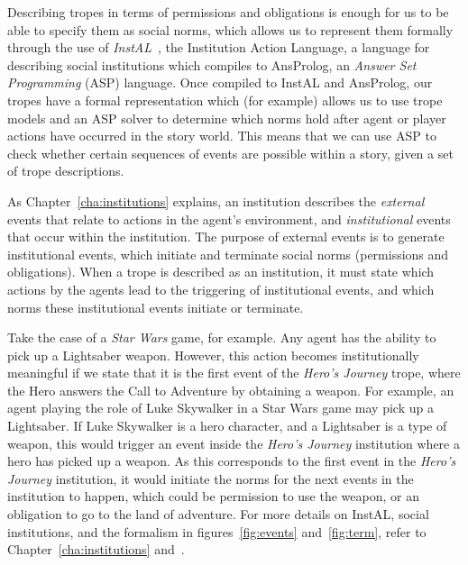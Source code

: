 \documentclass[11pt]{report}
\begin{document}
Describing tropes in terms of permissions and obligations is enough for us to be
able to specify them as social norms, which allows us to represent them
formally through the use of \emph{InstAL}~\citep{cliffe2007specifying}, the
Institution Action Language, a language for describing social institutions which compiles to AnsProlog, an \emph{Answer Set Programming} (ASP) language.
Once compiled to InstAL and AnsProlog, our tropes have a formal representation
which (for example) allows us to use trope models and an ASP solver to determine
which norms hold after agent or player actions have occurred in the story world.
This means that we can use ASP to check whether certain sequences of events are possible within a story,
given a set of trope descriptions.

As Chapter~\ref{cha:institutions} explains, an institution describes the
\emph{external} events that relate to actions in the agent's environment, and
\emph{institutional} events that occur within the institution. The purpose of
external events is to generate institutional events, which initiate and
terminate social norms (permissions and obligations). When a trope is described
as an institution, it must state which actions by the agents lead
to the triggering of institutional events, and which norms these institutional
events initiate or terminate.

Take the case of a \emph{Star Wars} game, for example. Any agent has the ability
to pick up a Lightsaber weapon. However, this action becomes institutionally
meaningful if we state that it is the first event of the \emph{Hero's Journey}
trope, where the Hero answers the Call to Adventure by obtaining a weapon.
For example, an agent playing the role of Luke Skywalker in a Star Wars game may
pick up a Lightsaber. If Luke Skywalker is a hero character, and a Lightsaber is
a type of weapon, this would trigger an event inside the \emph{Hero's Journey}
institution where a hero has
picked up a weapon. As this corresponds to the first event in the \emph{Hero's
  Journey} institution, it would initiate the norms for the next events in
the institution to happen, which could be permission to use the weapon, or an obligation to go to the land of adventure.
For more details on InstAL, social institutions, and the formalism in
figures~\ref{fig:events} and~\ref{fig:term}, refer to
Chapter~\ref{cha:institutions} and~\citep{cliffe2007specifying}.
\end{document}
